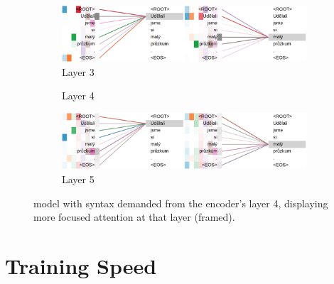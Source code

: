 \begin{figure}[t]
\begin{subfigure}[b]{0.9\textwidth}
        \centering
	    \includegraphics[width=\textwidth]{img/att-from4-l3.png}
        \caption{Layer 3}
    \end{subfigure}
    \par\medskip
    \begin{subfigure}[b]{0.9\textwidth}
        \centering
        \caption{Layer 4}
    \end{subfigure}
    \par\medskip
    \begin{subfigure}[b]{0.9\textwidth}
        \centering
	    \includegraphics[width=\textwidth]{img/att-from4-l5.png}
        \caption{Layer 5}
    \end{subfigure}
    \caption{\DepParse model with syntax demanded from the encoder's layer 4, displaying more focused attention at that layer (framed).}
    \label{fig:att-from4}
\end{figure}


\section{Training Speed}
\label{result-speed}

